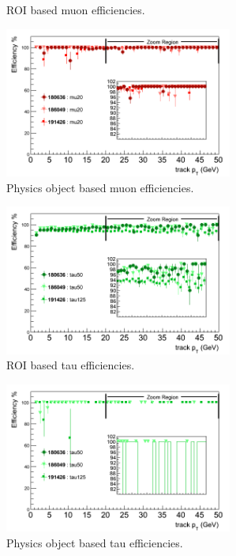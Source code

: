 \begin{figure}[htbp]
\begin{subfigure}{.5\linewidth}
		\caption{ROI based muon efficiencies.}
		\label{fig:trig_2011_L2_pt_c}
	\end{subfigure}
	\begin{subfigure}{.5\linewidth}	
		\centering
		\includegraphics[width=75mm]{f/mu20_IDTrkNoCut_pT_IDS_eff_comb}
		\caption{Physics object based muon efficiencies.}
		\label{fig:trig_2011_L2_pt_d}
	\end{subfigure}
	\begin{subfigure}{.5\linewidth}	
		\centering
		\includegraphics[width=75mm]{f/tau50_IDTrkNoCut_pT_SIT_eff}
		\caption{ROI based tau efficiencies.}
		\label{fig:trig_2011_L2_pt_e}
	\end{subfigure}
	\begin{subfigure}{.5\linewidth}	
		\centering
		\includegraphics[width=75mm]{f/tau50_IDTrkNoCut_pT_SIT_eff_comb}
		\caption{Physics object based tau efficiencies.}
		\label{fig:trig_2011_L2_pt_f}
	\end{subfigure}
	\begin{center}
	\begin{subfigure}{.5\linewidth}	

\end{subfigure}
\end{center}
\end{figure}
